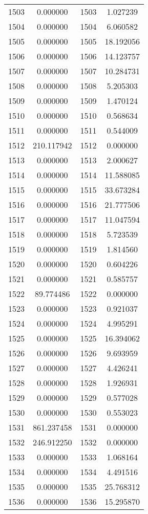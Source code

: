 \documentclass[12pt]{article}
\begin{document}
\begin{longtable}{@{}cccc@{}}
1503 & 0.000000 & 1503 & 1.027239 \\
1504 & 0.000000 & 1504 & 6.060582 \\
1505 & 0.000000 & 1505 & 18.192056 \\
1506 & 0.000000 & 1506 & 14.123757 \\
1507 & 0.000000 & 1507 & 10.284731 \\
1508 & 0.000000 & 1508 & 5.205303 \\
1509 & 0.000000 & 1509 & 1.470124 \\
1510 & 0.000000 & 1510 & 0.568634 \\
1511 & 0.000000 & 1511 & 0.544009 \\
1512 & 210.117942 & 1512 & 0.000000 \\
1513 & 0.000000 & 1513 & 2.000627 \\
1514 & 0.000000 & 1514 & 11.588085 \\
1515 & 0.000000 & 1515 & 33.673284 \\
1516 & 0.000000 & 1516 & 21.777506 \\
1517 & 0.000000 & 1517 & 11.047594 \\
1518 & 0.000000 & 1518 & 5.723539 \\
1519 & 0.000000 & 1519 & 1.814560 \\
1520 & 0.000000 & 1520 & 0.604226 \\
1521 & 0.000000 & 1521 & 0.585757 \\
1522 & 89.774486 & 1522 & 0.000000 \\
1523 & 0.000000 & 1523 & 0.921037 \\
1524 & 0.000000 & 1524 & 4.995291 \\
1525 & 0.000000 & 1525 & 16.394062 \\
1526 & 0.000000 & 1526 & 9.693959 \\
1527 & 0.000000 & 1527 & 4.426241 \\
1528 & 0.000000 & 1528 & 1.926931 \\
1529 & 0.000000 & 1529 & 0.577028 \\
1530 & 0.000000 & 1530 & 0.553023 \\
1531 & 861.237458 & 1531 & 0.000000 \\
1532 & 246.912250 & 1532 & 0.000000 \\
1533 & 0.000000 & 1533 & 1.068164 \\
1534 & 0.000000 & 1534 & 4.491516 \\
1535 & 0.000000 & 1535 & 25.768312 \\
1536 & 0.000000 & 1536 & 15.295870 \\

\end{longtable}
\end{document}

